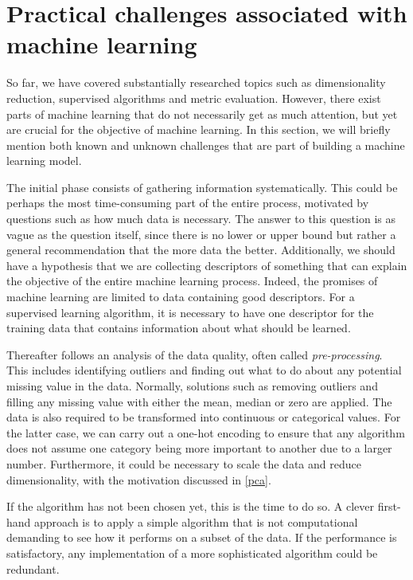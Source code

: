 \section{Practical challenges associated with machine learning}

So far, we have covered substantially researched topics such as dimensionality reduction, supervised algorithms and metric evaluation. However, there exist parts of machine learning that do not necessarily get as much attention, but yet are crucial for the objective of machine learning. In this section, we will briefly mention both known and unknown challenges that are part of building a machine learning model.

The initial phase consists of gathering information systematically. This could be perhaps the most time-consuming part of the entire process, motivated by questions such as how much data is necessary. The answer to this question is as vague as the question itself, since there is no lower or upper bound but rather a general recommendation that the more data the better. Additionally, we should have a hypothesis that we are collecting descriptors of something that can explain the objective of the entire machine learning process. Indeed, the promises of machine learning are limited to data containing good descriptors. For a supervised learning algorithm, it is necessary to have one descriptor for the training data that contains information about what should be learned.

Thereafter follows an analysis of the data quality, often called \textit{pre-processing}. This includes identifying outliers and finding out what to do about any potential missing value in the data. Normally, solutions such as removing outliers and filling any missing value with either the mean, median or zero are applied. The data is also required to be transformed into continuous or categorical values. For the latter case, we can carry out a one-hot encoding to ensure that any algorithm does not assume one category being more important to another due to a larger number. Furthermore, it could be necessary to scale the data and reduce dimensionality, with the motivation discussed in \autoref{pca}.

If the algorithm has not been chosen yet, this is the time to do so. A clever first-hand approach is to apply a simple algorithm that is not computational demanding to see how it performs on a subset of the data. If the performance is satisfactory, any implementation of a more sophisticated algorithm could be redundant.

